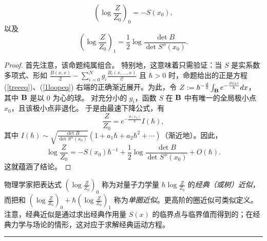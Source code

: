 \begin{theorem}\label{trees1l}
\begin{equation}\label{treeeq}
\left(\log\frac{Z}{Z_0}\right)_0=-S(x_0),
\end{equation}
以及
\begin{equation}\label{1loopeq}
\left(\log\frac{Z}{Z_0}\right)_1=\frac{1}{2}\log \frac{\det B}{\det S''(x_0)}.
\end{equation}
\end{theorem}

\begin{proof}
首先注意，该命题纯属组合。
特别地，这意味着只需验证：当 $S$ 是实系数多项式、形如 $\frac{B(x,x)}{2}-\sum_{i=0}^Ng_i\frac{B_i(x, \ldots,x)}{i!}$ 且 $\hbar>0$ 时，命题给出的正是方程 (\ref{treeeq})、(\ref{1loopeq}) 右端的正确渐近展开。为此，令 $Z:=\hbar^{-\frac{d}{2}}\int_{\bold B}e^{-\frac{S(x)}{\hbar}}dx$，
其中 $\bold B$ 是以 $0$ 为心的球。
对充分小的 $g_i$，函数 $S$ 在 $\bold B$ 中有唯一的全局极小点 $x_0$，且该极小点非退化。
于是由最速下降公式，有
$$
\frac{Z}{Z_0}=e^{-\frac{S(x_0)}{\hbar}}I(\hbar), 
$$
其中 $I(\hbar)\sim\sqrt{\frac{\det B}{\det
    S''(x_0)}}(1+a_1\hbar+a_2\hbar^2+ \cdots )$（渐近地）。因此，
$$
\log\frac{Z}{Z_0}=-S(x_0)\hbar^{-1}+\frac{1}{2}\log
\frac{\det B}{\det S''(x_0)}+O(\hbar).
$$
这就蕴涵了结论。
\end{proof}


物理学家把表达式 $(\log\frac{Z}{Z_0})_0$ 称为对量子力学量 $\hbar\log\frac{Z}{Z_0}$ 的\emph{经典（或树）近似}，而把和 $(\log\frac{Z}{Z_0})_0+\hbar(\log\frac{Z}{Z_0})_1$ 称为\emph{单圈近似}。更高阶的圈近似可类似定义。注意，经典近似是通过求出经典作用量 $S(x)$ 的临界点与临界值而得到的；在经典力学与场论的情形，这对应于求解经典运动方程。

\bigskip
\noindent\rule{\textwidth}{0.6pt}


